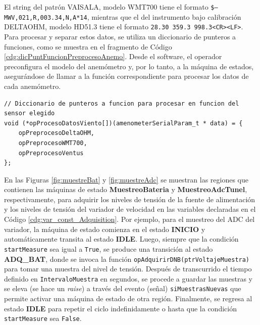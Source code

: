 El string del patrón VAISALA, modelo WMT700 tiene el formato \texttt{\$--MWV,021,R,003.34,N,A*14}, mientras que el del instrumento bajo calibración DELTAOHM, modelo HD51.3 tiene el formato \texttt{28.30 359.3 998.3<CR><LF>}. Para procesar y separar estos datos, se utiliza un diccionario de punteros a funciones, como se muestra en el fragmento de Código \ref{cdg:dicPuntFuncionPreprocesoAnemo}. Desde el software, el operador preconfigura el modelo del anemómetro y, por lo tanto, a la máquina de estados, asegurándose de llamar a la función correspondiente para procesar los datos de cada anemómetro.

\begin{lstlisting}[style=cstyle, caption={Diccionario de punteros a función para procesar los datos recibidos de los anemómetros.}, label=cdg:dicPuntFuncionPreprocesoAnemo,basicstyle=\ttfamily\fontsize{8}{8}\selectfont]
// Diccionario de punteros a funcion para procesar en funcion del sensor elegido
void (*opProcesoDatosViento[])(amenometerSerialParam_t * data) = {
    opPreprocesoDeltaOHM,
    opPreprocesoWMT700,
    opPreprocesoVentus
};
\end{lstlisting}

En las Figuras \ref{fig:muestreBat} y \ref{fig:muestreAdc} se muestran las regiones que contienen las máquinas de estado \textbf{MuestreoBateria} y \textbf{MuestreoAdcTunel}, respectivamente, para adquirir los niveles de tensión de la fuente de alimentación y los niveles de tensión del variador de velocidad en las variables declaradas en el Código \ref{cdg:var_const_Adquisition}. Por ejemplo, para el muestreo del ADC del variador, la máquina de estado comienza en el estado \textbf{INICIO} y automáticamente transita al estado \textbf{IDLE}. Luego, siempre que la condición \texttt{startMeasure} sea igual a \texttt{True}, se produce una transición al estado \textbf{ADQ\_BAT}, donde se invoca la función \texttt{opAdquirirDNB(ptrVoltajeMuestra)} para tomar una muestra del nivel de tensión. Después de transcurrido el tiempo definido en \texttt{IntervaloMuestra} en segundos, se procede a guardar las muestras y se eleva (se hace un \textit{raise}) a través del evento (señal) \texttt{siMuestrasNuevas} que permite activar una máquina de estado de otra región. Finalmente, se regresa al estado \textbf{IDLE} para repetir el ciclo indefinidamente o hasta que la condición \texttt{startMeasure} sea \texttt{False}.


